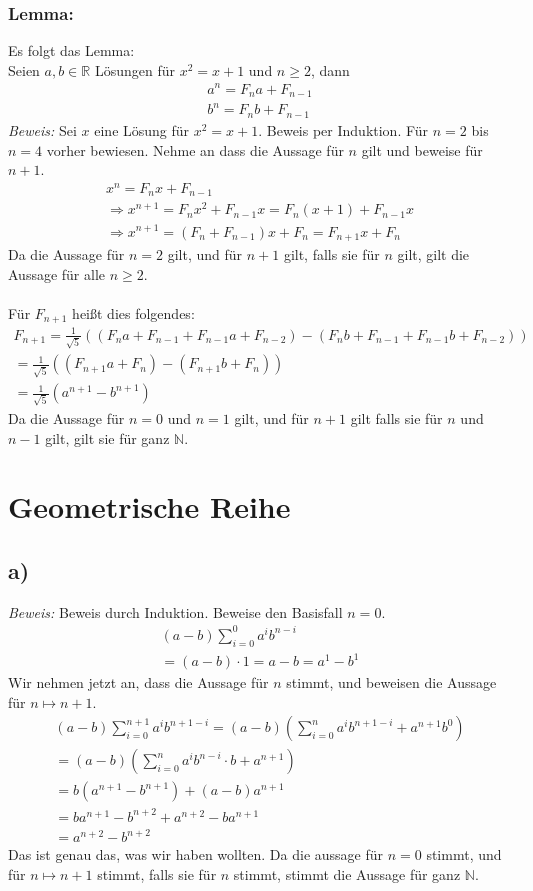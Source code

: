 \documentclass[]{scrartcl}
\begin{document}
\subsubsection{Lemma:}
Es folgt das Lemma:\\
Seien $a,b\in\mathbb{R}$ Lösungen für $x^2 = x +1$ und $n\geq2$, dann
\begin{gather}
	a^n = F_n a + F_{n-1}\\
	b^n = F_n b + F_{n-1}
\end{gather}
\textit{Beweis: } Sei $x$ eine Lösung für $x^2 = x +1$. Beweis per Induktion. Für $n=2$ bis $n=4$ vorher bewiesen. Nehme an dass die Aussage für $n$ gilt und beweise für $n+1$.
\begin{gather}
	x^n = F_n x + F_{n-1}\\
	\Rightarrow x^{n+1} = F_n x^2 + F_{n-1}x = F_n (x+1) + F_{n-1}x\\
	\Rightarrow x^{n+1} = (F_n + F_{n-1})x + F_n = F_{n+1}x + F_n
\end{gather}
Da die Aussage für $n=2$ gilt, und für $n+1$ gilt, falls sie für $n$ gilt, gilt die Aussage für alle $n\geq2$.\\\\
Für $F_{n+1}$ heißt dies folgendes:
\begin{gather}
	F_{n+1} = \frac{1}{\sqrt5}\left((F_na + F_{n-1} + F_{n-1}a + F_{n-2}) - (F_nb + F_{n-1} + F_{n-1}b + F_{n-2})\right)\\
	= \frac{1}{\sqrt5}\left((F_{n+1}a + F_n) - (F_{n+1}b + F_n)\right)\\
	= \frac{1}{\sqrt5}(a^{n+1}-b^{n+1})
\end{gather}
Da die Aussage für $n = 0$ und $n = 1$ gilt, und für $n+1$ gilt falls sie für $n$ und $n-1$ gilt, gilt sie für ganz $\mathbb N$.

\section{Geometrische Reihe}

\subsection{a)}
\textit{Beweis: }Beweis durch Induktion. Beweise den Basisfall $n=0$.
\begin{gather}
	(a-b)\sum_{i=0}^0 a^ib^{n-i}\\
	= (a-b)\cdot 1 = a-b = a^1 - b^1
\end{gather}
Wir nehmen jetzt an, dass die Aussage für $n$ stimmt, und beweisen die Aussage für $n\mapsto n+1$.
\begin{gather}
	(a-b)\sum_{i=0}^{n+1} a^ib^{n+1-i} = (a-b)\left(\sum_{i=0}^{n} a^ib^{n+1-i} + a^{n+1}b^0\right)\\
	= (a-b)\left(\sum_{i = 0}^{n}a^ib^{n-i}\cdot b + a^{n+1}\right)\\
	= b(a^{n+1} - b^{n+1}) + (a-b)a^{n+1}\\
	= ba^{n+1} - b^{n+2} + a^{n+2} - ba^{n+1}\\
	= a^{n+2} - b^{n+2}
\end{gather}
Das ist genau das, was wir haben wollten. Da die aussage für $n=0$ stimmt, und für $n\mapsto n+1$ stimmt, falls sie für $n$ stimmt, stimmt die Aussage für ganz $\mathbb{N}$.
\end{document}
